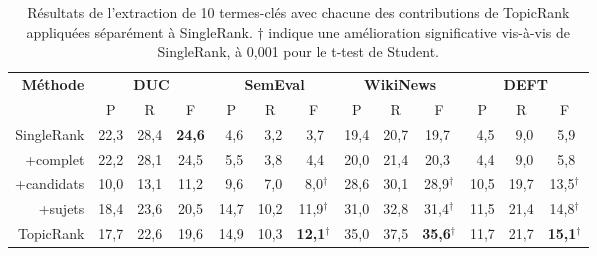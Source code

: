     \begin{table}
      \centering
      \begin{tabular}{@{~}r@{~~}c@{~~}c@{~~}c@{~~}c@{~~}c@{~~}c@{~~}c@{~~}c@{~~}c@{~~}c@{~~}c@{~~}c@{~}}
        \toprule
        \multirow{2}{*}[-2pt]{\textbf{Méthode}} & \multicolumn{3}{c}{\textbf{DUC}} & \multicolumn{3}{c}{\textbf{SemEval}} & \multicolumn{3}{c}{\textbf{WikiNews}} & \multicolumn{3}{c}{\textbf{DEFT}}\\
        \cmidrule(r){2-4}\cmidrule(r){5-7}\cmidrule(r){8-10}\cmidrule{11-13}
        & P & R & F & P & R & F & P & R & F & P & R & F\\
        \midrule
        SingleRank & 22,3 & 28,4 & \textbf{24,6} & $~~$4,6 & $~~$3,2 & $~~$3,7$^{~}$ & 19,4 & 20,7 & 19,7$^{~}$ & $~~$4,5 & $~~$9,0 & $~~$5,9$^{~}$\\
        +complet & 22,2 & 28,1 & 24,5 & $~~$5,5 & $~~$3,8 & $~~$4,4$^{~}$ & 20,0 & 21,4 & 20,3${~}$ & $~~$4,4 & $~~$9,0 & $~~$5,8$^{~}$\\
        +candidats & 10,0 & 13,1 & 11,2 & $~~$9,6 & $~~$7,0 & $~~$8,0$^\dagger$ & 28,6 & 30,1 & 28,9$^\dagger$ & 10,5 & 19,7 & 13,5$^\dagger$\\
        +sujets & 18,4 & 23,6 & 20,5 & 14,7 & 10,2 & 11,9$^\dagger$ & 31,0 & 32,8 & 31,4$^\dagger$ & 11,5 & 21,4 & 14,8$^\dagger$\\
        TopicRank & 17,7 & 22,6 & 19,6 & 14,9 & 10,3 & \textbf{12,1}$^\dagger$ & 35,0 & 37,5 & \textbf{35,6}$^\dagger$ & 11,7 & 21,7 & \textbf{15,1}$^\dagger$\\
        \bottomrule
      \end{tabular}
      \caption{Résultats de l'extraction de 10 termes-clés avec chacune des
               contributions de TopicRank appliquées séparément à SingleRank.
               $\dagger$ indique une amélioration significative vis-à-vis de
               SingleRank, à 0,001 pour le t-test de Student.
               \label{tab:evaluation_individuelle_des_ameliorations}}
    \end{table}

